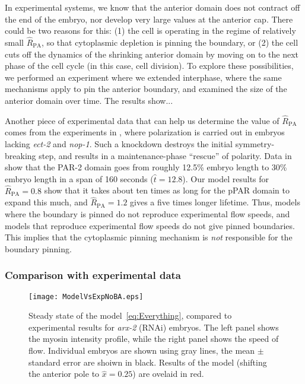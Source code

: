 \documentclass[11pt]{article}
\newcommand{\red}[1]{\color{red}#1\normalcolor}
\newcommand{\6}[1]{#1_{\text{6}}}
\newcommand{\3}[1]{#1_{\text{3}}}
\begin{document}
In experimental systems, we know that the anterior domain does not contract off the end of the embryo, nor develop very large values at the anterior cap. There could be two reasons for this: (1) the cell is operating in the regime of relatively small $\hat R_\text{PA}$, so that cytoplasmic depletion is pinning the boundary, or (2) the cell cuts off the dynamics of the shrinking anterior domain by moving on to the next phase of the cell cycle (in this case, cell division). \red{To explore these possibilities, we performed an experiment where we extended interphase, where the same mechanisms apply to pin the anterior boundary, and examined the size of the anterior domain over time. The results show...}

Another piece of experimental data that can help us determine the value of $\hat R_\text{PA}$ comes from the experiments in \cite{tse2012rhoa}, where polarization is carried out in embryos lacking \emph{ect-2} and \emph{nop-1}. Such a knockdown destroys the initial symmetry-breaking step, and results in a maintenance-phase ``rescue'' of polarity. Data in \cite[Fig.~7D]{tse2012rhoa} show that the  PAR-2 domain goes from roughly 12.5\% embryo length to 30\% embryo length in a span of 160 seconds ($\hat t = 12.8$). Our model results for $\hat R_\text{PA}=0.8$ show that it takes about ten times as long for the pPAR domain to expand this much, and $\hat R_\text{PA}=1.2$ gives a five times longer lifetime. Thus, models where the boundary is pinned do not reproduce experimental flow speeds, and models that reproduce experimental flow speeds do not give pinned boundaries. This implies that the cytoplasmic pinning mechanism is \emph{not} responsible for the boundary pinning.

\subsubsection{Comparison with experimental data}
\begin{figure}
\centering
\texttt{[image: ModelVsExpNoBA.eps]}
\caption{\label{fig:StStNoBA}Steady state of the model\ \eqref{eq:Everything}, compared to experimental results for \emph{arx-2} (RNAi) embryos. The left panel shows the myosin intensity profile, while the right panel shows the speed of flow. Individual embryos are shown using gray lines, the mean $\pm$ standard error are shoiwn in black. Results of the model (shifting the anterior pole to $\hat x = 0.25$) are ovelaid in red.}
\end{figure}
\end{document}

